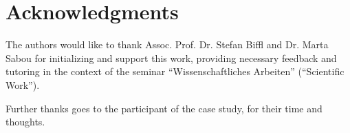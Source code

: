 \section{Acknowledgments}
The authors would like to thank Assoc. Prof. Dr. Stefan Biffl and Dr. Marta Sabou for initializing and support this work, providing necessary feedback and 	tutoring in the context of the seminar ``Wissenschaftliches Arbeiten'' (``Scientific Work'').

Further thanks goes to the participant of the case study, for their time and thoughts.